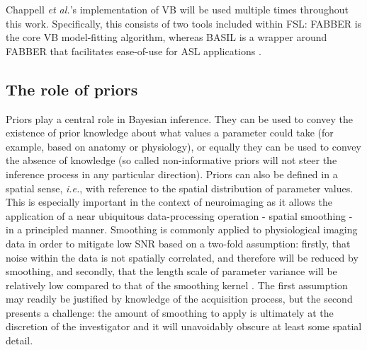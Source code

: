 \documentclass[12pt]{report}
\begin{document}
Chappell \textit{et al.}'s implementation of VB will be used multiple times throughout this work. Specifically, this consists of two tools included within FSL: FABBER is the core VB model-fitting algorithm, whereas BASIL is a wrapper around FABBER that facilitates ease-of-use for ASL applications \cite{Chappell2009, Chappell2011}. 

\subsection{The role of priors}
\label{vb_spatial_prior}

Priors play a central role in Bayesian inference. They can be used to convey the existence of prior knowledge about what values a parameter could take (for example, based on anatomy or physiology), or equally they can be used to convey the absence of knowledge (so called non-informative priors will not steer the inference process in any particular direction). Priors can also be defined in a spatial sense, \textit{i.e.}, with reference to the spatial distribution of parameter values. This is especially important in the context of neuroimaging as it allows the application of a near ubiquitous data-processing operation - spatial smoothing - in a principled manner. Smoothing is commonly applied to physiological imaging data in order to mitigate low SNR based on a two-fold assumption: firstly, that noise within the data is not spatially correlated, and therefore will be reduced by smoothing, and secondly, that the length scale of parameter variance will be relatively low compared to that of the smoothing kernel \cite{Jenkinson2017a}. The first assumption may readily be justified by knowledge of the acquisition process, but the second presents a challenge: the amount of smoothing to apply is ultimately at the discretion of the investigator and it will unavoidably obscure at least some spatial detail. 
\end{document}
